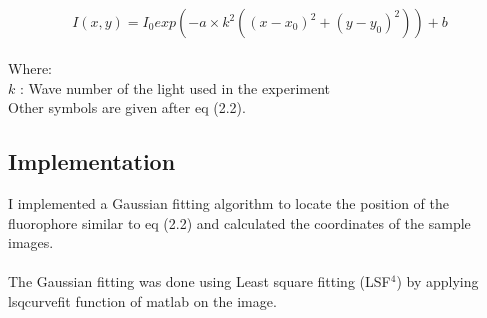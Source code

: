 \documentclass[paper=a4, fontsize=11pt]{scrartcl}
\numberwithin{equation}{section}		%
\numberwithin{figure}{section}			%
\numberwithin{table}{section}				%
\begin{document}
\begin{align}
	\begin{split}
I (x, y) = I_0 exp(-a \times k^2 ((x - x_0)^2 + (y - y_0)^2)) + b
	\end{split}
\end{align}

Where:\\
$k$ : Wave number of the light used in the experiment \\
Other symbols are given after eq (2.2). \\

\subsection{Implementation}
I implemented a Gaussian fitting algorithm to locate the position of the fluorophore similar to eq (2.2) and calculated the coordinates of the sample images.
\paragraph{}
The Gaussian fitting was done using Least square fitting (LSF$^4$) by applying lsqcurvefit function of matlab on the image.
\clearpage
\end{document}
